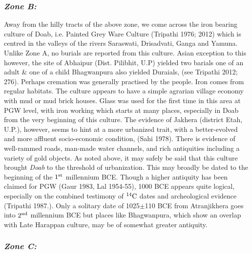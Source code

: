 \vspace{-.4cm}

\subsubsection*{\textit{Zone B:}}

\vspace{-.2cm}

Away from the hilly tracts of the above zone, we come across the iron bearing culture of Doab, i.e. Painted Grey Ware Culture (Tripathi 1976; 2012) which is centred in the valleys of the rivers Saraswati, Drisadvati, Ganga and Yamuna. Unlike Zone A, no burials are reported from this culture. Asian exception to this however, the site of Abhaipur (Dist. Pilibhit, U.P) yielded two barials one of an adult \& one of a child Bhagwanpura also yielded Duraials, (see Tripathi 2012; 276). Perhaps cremation was generally practised by the people. Iron comes from regular habitats. The culture appears to have a simple agrarian village economy with mud or mud brick houses. Glass was used for the first time in this area at PGW level, with iron working which starts at many places, especially in Doab from the very beginning of this culture. The evidence of Jakhera (district Etah, U.P.), however, seems to hint at a more urbanized trait, with a better-evolved and more affluent socio-economic condition, (Sahi 1978). There is evidence of well-rammed roads, man-made water channels, and rich antiquities including a variety of gold objects. As noted above, it may safely be said that this culture brought \textit{Doab} to the threshold of urbanization. This may broadly be dated to the beginning of the $1^{\rm st}$ millennium BCE. Though a higher antiquity has been claimed for PGW (Gaur 1983, Lal 1954-55), 1000 BCE appears quite logical, especially on the combined testimony of $^{14}{\rm C}$ dates and archeological evidence (Tripathi 1987.). Only a solitary date of 1025$\pm$110 BCE from Atranjikhera goes into $2^{\rm nd}$ millennium BCE but places like Bhagwanpura, which show an overlap with Late Harappan culture, may be of somewhat greater antiquity.

\vspace{-.3cm}

\subsubsection*{\textit{Zone C:}}

\vspace{-.2cm}

